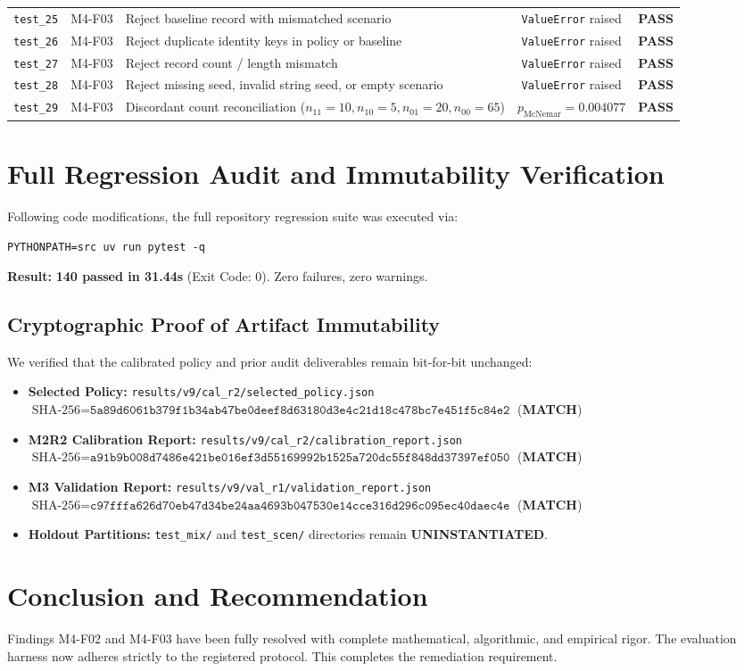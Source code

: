 \documentclass[10pt,a4paper]{article}
\begin{document}
\begin{table}[htbp]
\begin{tabularx}{\textwidth}{llXcc}
\texttt{test\_25} & M4-F03 & Reject baseline record with mismatched scenario & \texttt{ValueError} raised & \textbf{PASS} \\
\texttt{test\_26} & M4-F03 & Reject duplicate identity keys in policy or baseline & \texttt{ValueError} raised & \textbf{PASS} \\
\texttt{test\_27} & M4-F03 & Reject record count / length mismatch & \texttt{ValueError} raised & \textbf{PASS} \\
\texttt{test\_28} & M4-F03 & Reject missing seed, invalid string seed, or empty scenario & \texttt{ValueError} raised & \textbf{PASS} \\
\texttt{test\_29} & M4-F03 & Discordant count reconciliation ($n_{11}=10, n_{10}=5, n_{01}=20, n_{00}=65$) & $p_{\mathrm{McNemar}} = 0.004077$ & \textbf{PASS} \\
\bottomrule
\end{tabularx}
\end{table}

\section{Full Regression Audit and Immutability Verification}
Following code modifications, the full repository regression suite was executed via:
\begin{center}
\texttt{PYTHONPATH=src uv run pytest -q}
\end{center}
\textbf{Result:} \textbf{140 passed in 31.44s} (Exit Code: 0). Zero failures, zero warnings.

\subsection{Cryptographic Proof of Artifact Immutability}
We verified that the calibrated policy and prior audit deliverables remain bit-for-bit unchanged:
\begin{itemize}
    \item \textbf{Selected Policy:} \texttt{results/v9/cal\_r2/selected\_policy.json} \\
    $\text{SHA-256} = \texttt{5a89d6061b379f1b34ab47be0deef8d63180d3e4c21d18c478bc7e451f5c84e2}$ (\textbf{MATCH})
    \item \textbf{M2R2 Calibration Report:} \texttt{results/v9/cal\_r2/calibration\_report.json} \\
    $\text{SHA-256} = \texttt{a91b9b008d7486e421be016ef3d55169992b1525a720dc55f848dd37397ef050}$ (\textbf{MATCH})
    \item \textbf{M3 Validation Report:} \texttt{results/v9/val\_r1/validation\_report.json} \\
    $\text{SHA-256} = \texttt{c97fffa626d70eb47d34be24aa4693b047530e14cce316d296c095ec40daec4e}$ (\textbf{MATCH})
    \item \textbf{Holdout Partitions:} \texttt{test\_mix/} and \texttt{test\_scen/} directories remain \textbf{UNINSTANTIATED}.
\end{itemize}

\section{Conclusion and Recommendation}
Findings M4-F02 and M4-F03 have been fully resolved with complete mathematical, algorithmic, and empirical rigor. The evaluation harness now adheres strictly to the registered protocol. This completes the remediation requirement.
\end{document}
